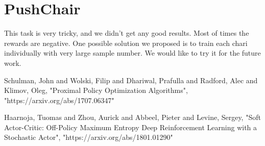 \documentclass[letterpaper,11pt]{article}
\begin{document}
\section{PushChair}
This task is very tricky, and we didn't get any good results. 
Most of times the rewards are negative. One possible solution we proposed is to train each chari individually
 with very large sample number. We would like to try it for the future work.

\begin{thebibliography}{99}

Schulman, John and Wolski, Filip and Dhariwal, Prafulla and Radford, Alec and Klimov, Oleg,
 "Proximal Policy Optimization Algorithms",
"https://arxiv.org/abs/1707.06347"

Haarnoja, Tuomas and Zhou, Aurick and Abbeel, Pieter and Levine, Sergey,
 "Soft Actor-Critic: Off-Policy Maximum Entropy Deep Reinforcement Learning with a Stochastic Actor",
"https://arxiv.org/abs/1801.01290"


\end{thebibliography}





\end{document}
